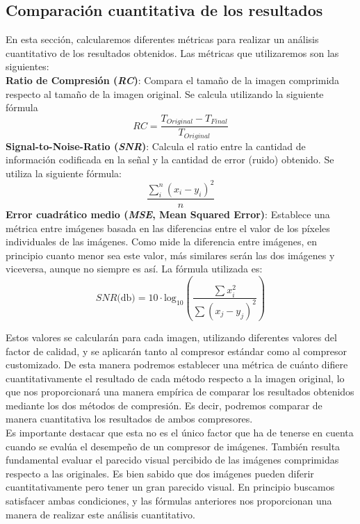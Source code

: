 \documentclass[12pt,a4paper]{article}
\begin{document}
\subsection{Comparación cuantitativa de los resultados} \label{metricasCuant}
En esta sección, calcularemos diferentes métricas para realizar un análisis cuantitativo de los resultados obtenidos. Las métricas que utilizaremos son las siguientes:\\
\textbf{Ratio de Compresión (\textit{RC})}: Compara el tamaño de la imagen comprimida respecto al tamaño de la imagen original. Se calcula utilizando la siguiente fórmula
\[
RC = \frac{T_{Original}-T_{Final}}{T_{Original}}
\]
\textbf{Signal-to-Noise-Ratio (\textit{SNR})}: Calcula el ratio entre la cantidad de información codificada en la señal y la cantidad de error (ruido) obtenido. Se utiliza la siguiente fórmula:
\[
\frac{\sum_i^n(x_i-y_i)^2}{n}
\]
\textbf{Error cuadrático medio (\textit{MSE}, Mean Squared Error)}: Establece una métrica entre imágenes basada en las diferencias entre el valor de los píxeles individuales de las imágenes. Como mide la diferencia entre imágenes, en principio cuanto menor sea este valor, más similares serán las dos imágenes y viceversa, aunque no siempre es así. La fórmula utilizada es:
\[
SNR\text{(db)} = 10\cdot \text{log}_{10} \left( \frac{\sum x_i^2}{\sum(x_j-y_j)^2} \right)
\]

Estos valores se calcularán para cada imagen, utilizando diferentes valores del factor de calidad, y se aplicarán tanto al compresor estándar como al compresor customizado.  De esta manera podremos establecer una métrica de cuánto difiere cuantitativamente el resultado de cada método respecto a la imagen original, lo que nos proporcionará una manera empírica de comparar los resultados obtenidos mediante los dos métodos de compresión. Es decir, podremos comparar de manera cuantitativa los resultados de ambos compresores.\\

Es importante destacar que esta no es el único factor que ha de tenerse en cuenta cuando se evalúa el desempeño de un compresor de imágenes. También resulta fundamental evaluar el parecido visual percibido de las imágenes comprimidas respecto a las originales. Es bien sabido que dos imágenes pueden diferir cuantitativamente pero tener un gran parecido visual. En principio buscamos satisfacer ambas condiciones, y las fórmulas anteriores nos proporcionan una manera de realizar este análisis cuantitativo.
\end{document}

